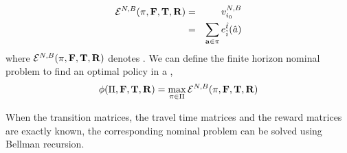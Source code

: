 \begin{eqnarray}
\mathcal{E}^{N,B}(\pi, {\mathbf{F}}, {\mathbf{T}}, {\mathbf{R}}) &=& v_{{i_0}}^{N,B} \\
&=& \sum_{\mathbf{a} \in \pi}e_{\hat{i}}^{\hat{t}}({\hat{a}})
\end{eqnarray}
where $\mathcal{E}^{N,B}(\pi, {\mathbf{F}}, {\mathbf{T}}, {\mathbf{R}})$ denotes {\totalexpectedearnings}. We can define the finite horizon nominal problem to find an optimal policy in a {\mdp},
\begin{equation}
\phi(\Pi, {\mathbf{F}}, {\mathbf{T}}, {\mathbf{R}}) = \max_{\pi \in \Pi} \mathcal{E}^{N,B}(\pi, {\mathbf{F}}, {\mathbf{T}}, {\mathbf{R}})
\end{equation}

When the transition matrices, the travel time matrices and the reward matrices are exactly known, the corresponding nominal problem can be solved using Bellman recursion.